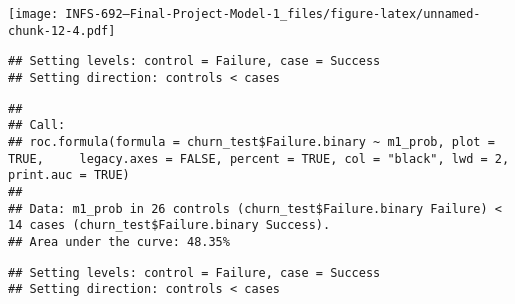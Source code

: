 \documentclass[
]{article}
\newenvironment{Shaded}{\begin{snugshade}}{\end{snugshade}}
\newcommand{\AttributeTok}[1]{\textcolor[rgb]{0.77,0.63,0.00}{#1}}
\newcommand{\CommentTok}[1]{\textcolor[rgb]{0.56,0.35,0.01}{\textit{#1}}}
\newcommand{\ConstantTok}[1]{\textcolor[rgb]{0.00,0.00,0.00}{#1}}
\newcommand{\DecValTok}[1]{\textcolor[rgb]{0.00,0.00,0.81}{#1}}
\newcommand{\FunctionTok}[1]{\textcolor[rgb]{0.00,0.00,0.00}{#1}}
\newcommand{\NormalTok}[1]{#1}
\newcommand{\SpecialCharTok}[1]{\textcolor[rgb]{0.00,0.00,0.00}{#1}}
\newcommand{\StringTok}[1]{\textcolor[rgb]{0.31,0.60,0.02}{#1}}
\begin{document}
\texttt{[image: INFS-692---Final-Project-Model-1\_files/figure-latex/unnamed-chunk-12-4.pdf]}

\begin{Shaded}
\end{Shaded}

\begin{verbatim}
## Setting levels: control = Failure, case = Success
## Setting direction: controls < cases
\end{verbatim}

\begin{verbatim}
## 
## Call:
## roc.formula(formula = churn_test$Failure.binary ~ m1_prob, plot = TRUE,     legacy.axes = FALSE, percent = TRUE, col = "black", lwd = 2,     print.auc = TRUE)
## 
## Data: m1_prob in 26 controls (churn_test$Failure.binary Failure) < 14 cases (churn_test$Failure.binary Success).
## Area under the curve: 48.35%
\end{verbatim}

\begin{Shaded}
\end{Shaded}

\begin{verbatim}
## Setting levels: control = Failure, case = Success
## Setting direction: controls < cases
\end{verbatim}
\end{document}
